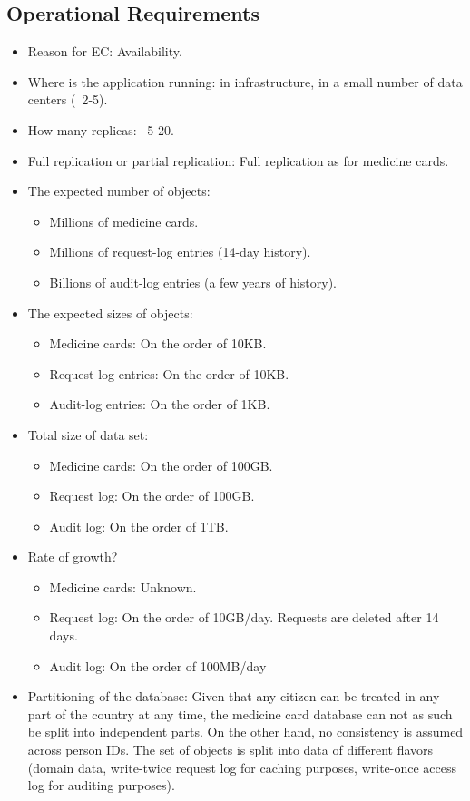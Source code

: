 \documentclass[11pt,a4paper]{report}
\begin{document}
\subsection{Operational Requirements}
\begin{itemize}
\item Reason for EC: Availability.
\item Where is the application running: in infrastructure, in a small number of data centers (~2-5).
\item How many replicas: ~5-20.
\item Full replication or partial replication: Full replication as for medicine cards.
\item The expected number of objects:
\begin{itemize}
\item Millions of medicine cards.
\item Millions of request-log entries (14-day history).
\item Billions of audit-log entries (a few years of history).
\end{itemize}
\item The expected sizes of objects:
\begin{itemize}
\item Medicine cards: On the order of 10KB.
\item Request-log entries: On the order of 10KB.
\item Audit-log entries: On the order of 1KB.
\end{itemize}
\item Total size of data set:    
\begin{itemize}
\item Medicine cards: On the order of 100GB.
\item Request log: On the order of 100GB.
\item Audit log: On the order of 1TB.
\end{itemize}
\item Rate of growth?
\begin{itemize}
\item Medicine cards: Unknown.
\item Request log: On the order of 10GB/day. Requests are deleted after 14 days.
\item Audit log: On the order of 100MB/day
\end{itemize}
\end{itemize}
\begin{itemize}
\item Partitioning of the database:
Given that any citizen can be treated in any part of the country at any time, the medicine card database can not as such be split into independent parts. On the other hand, no consistency is assumed across person IDs.
The set of objects is split into data of different flavors (domain data, write-twice request log for caching purposes, write-once access log for auditing purposes).
\end{itemize}
\end{document}
